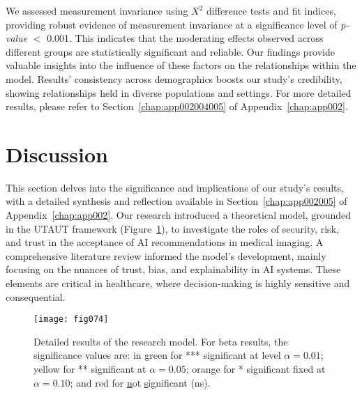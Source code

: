 

We assessed measurement invariance using $X^2$ difference tests and fit indices, providing robust evidence of measurement invariance at a significance level of {\it p-value} $<$ 0.001.
This indicates that the moderating effects observed across different groups are statistically significant and reliable.
Our findings provide valuable insights into the influence of these factors on the relationships within the model.
\textcolor{revised}{Results' consistency across demographics boosts our study's credibility, showing relationships held in diverse populations and settings.}
For more detailed results, please refer to Section~\ref{chap:app002004005} of Appendix~\ref{chap:app002}.

\section{Discussion}
\label{sec:chap004006}

\textcolor{revised}{This section delves into the significance and implications of our study's results, with a detailed synthesis and reflection available in Section~\ref{chap:app002005} of Appendix~\ref{chap:app002}.
Our research introduced a theoretical model, grounded in the \ac{UTAUT} framework \textcolor{revised}{(Figure~\ref{fig:fig074})}, to investigate the roles of security, risk, and trust in the acceptance of \ac{AI} recommendations in medical imaging.
A comprehensive literature review informed the model's development, mainly focusing on the nuances of trust, bias, and explainability in \ac{AI} systems.
These elements are critical in healthcare, where decision-making is highly sensitive and consequential.}

\begin{figure}[htpb]
\centering
\texttt{[image: fig074]}
\caption{Detailed results of the research model. For beta results, the significance values are: in green for *** significant at level $\alpha = 0.01$; yellow for ** significant at $\alpha = 0.05$; orange for * significant fixed at $\alpha = 0.10$; and red for \underline{n}ot \underline{s}ignificant (ns).}
\label{fig:fig074}
\end{figure}

